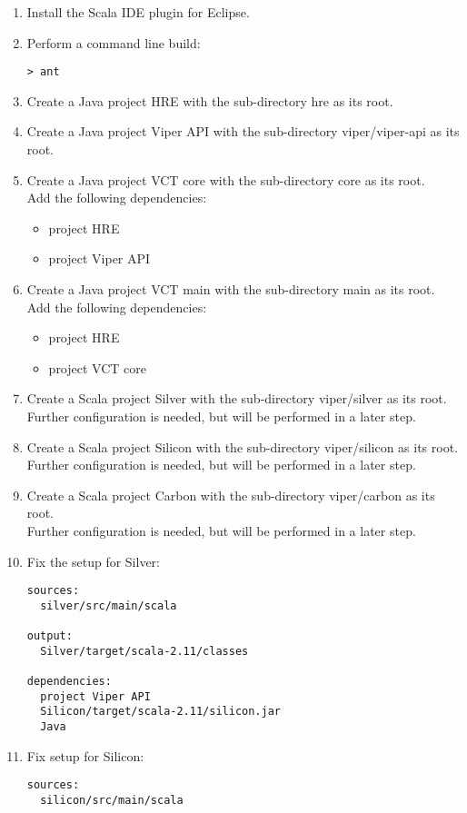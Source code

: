 \begin{enumerate}
\item Install the Scala IDE plugin for Eclipse.
\item Perform a command line build:
\begin{verbatim}
> ant
\end{verbatim}
\item Create a Java project HRE with the sub-directory hre as its root.
\item Create a Java project Viper API with the sub-directory viper/viper-api as its root.
\item Create a Java project VCT core with the sub-directory core as its root.
\\
Add the following dependencies:
\begin{itemize}
\item project HRE
\item project Viper API
\end{itemize}
\item Create a Java project VCT main with the sub-directory main as its root.
\\
Add the following dependencies:
\begin{itemize}
\item project HRE
\item project VCT core
\end{itemize}
\item Create a Scala project Silver with the sub-directory viper/silver as its root.
\\
Further configuration is needed, but will be performed in a later step.
\item Create a Scala project Silicon with the sub-directory viper/silicon as its root.
\\
Further configuration is needed, but will be performed in a later step.
\item Create a Scala project Carbon with the sub-directory viper/carbon as its root.
\\
Further configuration is needed, but will be performed in a later step.
\item Fix the setup for Silver:
\begin{verbatim}
sources:
  silver/src/main/scala

output:
  Silver/target/scala-2.11/classes

dependencies:
  project Viper API
  Silicon/target/scala-2.11/silicon.jar
  Java
\end{verbatim}
\item Fix setup for Silicon:
\begin{verbatim}
sources:
  silicon/src/main/scala


\end{verbatim}
\end{enumerate}
